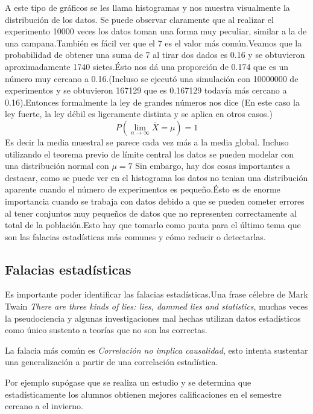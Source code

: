 \documentclass{article}
\begin{document}
A este tipo de gráficos se les llama histogramas y nos muestra visualmente la distribución de los datos.
Se puede observar claramente que al realizar el experimento 10000 veces los datos toman una forma muy peculiar, similar a la de una campana.También es fácil ver que el 7 es el valor más común.Veamos que la probabilidad de obtener una suma de 7 al tirar dos dados es 0.16 y se obtuvieron aproximadamente 1740 sietes.Ésto nos dá una proporción de 0.174 que es un número muy cercano a 0.16.(Incluso se ejecutó una simulación con 10000000 de experimentos y se obtuvieron 167129 que es 0.167129 todavía más cercano a 0.16).Entonces formalmente la ley de grandes números nos dice (En este caso la ley fuerte, la ley débil es ligeramente distinta y se aplica en otros casos.)
$$ P(\lim_{n\to\infty} \bar{X} = \mu ) = 1 $$
Es decir la media muestral se parece cada vez más a la media global.
Incluso utilizando el teorema previo de límite central los datos se pueden modelar con una distribución normal con $ \mu = 7 $
Sin embargo, hay dos cosas importantes a destacar, como se puede ver en el histograma los datos no tenian una distribución aparente cuando el número de experimentos es pequeño.Ésto es de enorme importancia cuando se trabaja con datos debido a que se pueden cometer errores al tener conjuntos muy pequeños de datos que no representen correctamente al total de la población.Esto hay que tomarlo como pauta para el último tema que son las falacias estadísticas más comunes y cómo reducir o detectarlas.






\subsection{Falacias estadísticas}

Es importante poder identificar las falacias estadísticas.Una frase célebre de Mark Twain \textit{There are three kinds of lies: lies, dammed lies and statistics}, muchas veces la pseudociencia y algunas investigaciones mal hechas utilizan datos estadísticos como único sustento a teorías que no son las correctas.

La falacia más común es \textit{Correlación no implica causalidad}, esto intenta sustentar una generalización a partir de una correlación estadística.

Por ejemplo supógase que se realiza un estudio y se determina que estadísticamente los alumnos obtienen mejores calificaciones en el semestre cercano a el invierno.
\end{document}
